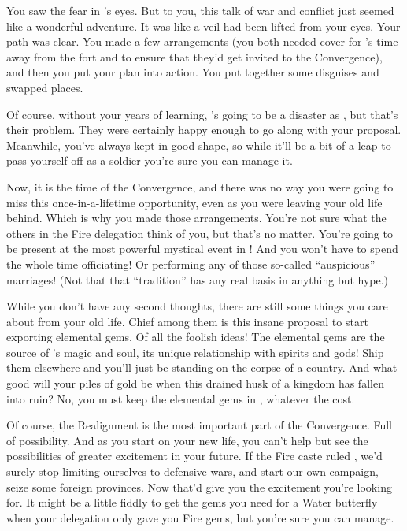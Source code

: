 \documentclass[char]{iron}
\begin{document}
You saw the fear in \cFakePriest{\real{\first}}'s eyes.  But to you,
this talk of war and conflict just seemed like a wonderful adventure.
It was like a veil had been lifted from your eyes.  Your path was
clear.  You made a few arrangements (you both needed cover for
\cFakePriest{\real{\first}}'s time away from the fort and to ensure
that they'd get invited to the Convergence), and then you put your plan
into action.  You put together some disguises and swapped places.

Of course, without your years of learning,
\cFakePriest{\real{\first}}'s going to be a disaster as
\cFakePriest{}, but that's their problem.  They were certainly happy
enough to go along with your proposal.  Meanwhile, you've always kept
in good shape, so while it'll be a bit of a leap to pass yourself off
as a soldier you're sure you can manage it.

Now, it is the time of the Convergence, and there was no
way you were going to miss this once-in-a-lifetime opportunity, even
as you were leaving your old life behind.  Which is why you made those
arrangements.  You're not sure what the others in the Fire delegation
think of you, but that's no matter.  You're going to be present at the
most powerful mystical event in \sHomeCountry{}!  And you won't have to
spend the whole time officiating!  Or performing any of those so-called
``auspicious'' marriages!  (Not that that ``tradition'' has any real
basis in anything but hype.)

While you don't have any second thoughts, there are still some things
you care about from your old life.  Chief among them is this insane
proposal to start exporting elemental gems.  Of all the foolish ideas!
The elemental gems are the source of \sHomeCountry{}'s magic and soul,
its unique relationship with spirits and gods!  Ship them elsewhere
and you'll just be standing on the corpse of a country.  And what good
will your piles of gold be when this drained husk of a kingdom has
fallen into ruin?  No, you must keep the elemental gems in
\sHomeCountry{}, whatever the cost.

Of course, the Realignment is the most important part of the Convergence.
Full of possibility.  And as you start on your new life, you can't
help but see the possibilities of greater excitement in your future.  If
the Fire caste ruled \sHomeCountry{}, we'd surely stop limiting ourselves
to defensive wars, and start our own campaign, seize some foreign provinces.
Now that'd give you the excitement you're looking for.  It might be a little
fiddly to get the gems you need for a Water butterfly when your delegation
only gave you Fire gems, but you're sure you can manage.
\end{document}
